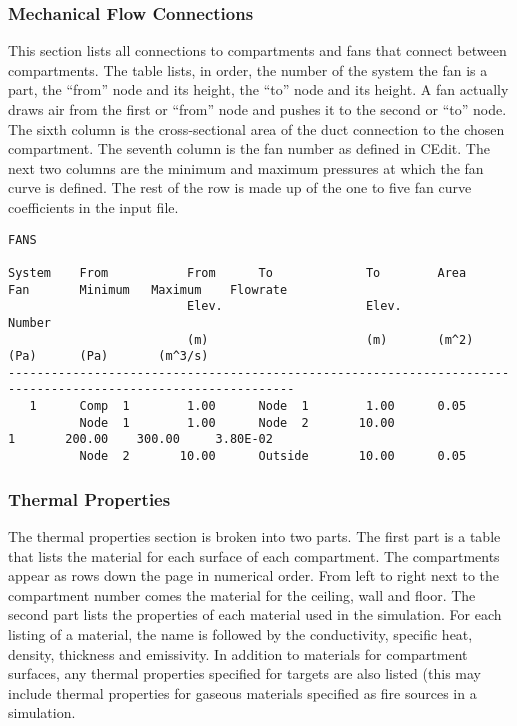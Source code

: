 \subsubsection{Mechanical Flow Connections}

This section lists all connections to compartments and fans that connect between compartments. The table lists, in order, the number of the system the fan is a part, the ``from'' node and its height, the ``to'' node and its height.  A fan actually draws air from the first or ``from'' node and pushes it to the second or ``to'' node. The sixth column is the cross-sectional area of the duct connection to the chosen compartment. The seventh column is the fan number as defined in CEdit.  The next two columns are the minimum and maximum pressures at which the fan curve is defined.  The rest of the row is made up of the one to five fan curve coefficients in the input file.

\begin{lstlisting}[basicstyle=\tiny]
FANS

System    From           From      To             To        Area      Fan       Minimum   Maximum    Flowrate
                         Elev.                    Elev.               Number
                         (m)                      (m)       (m^2)               (Pa)      (Pa)       (m^3/s)
--------------------------------------------------------------------------------------------------------------
   1      Comp  1        1.00      Node  1        1.00      0.05
          Node  1        1.00      Node  2       10.00                  1       200.00    300.00     3.80E-02
          Node  2       10.00      Outside       10.00      0.05
\end{lstlisting}

\subsubsection{Thermal Properties}

The thermal properties section is broken into two parts.  The first part is a table that lists the material for each surface of each compartment.  The compartments appear as rows down the page in numerical order.  From left to right next to the compartment number comes the material for the ceiling, wall and floor.  The second part lists the properties of each material used in the simulation. For each listing of a material, the name is followed by the conductivity, specific heat, density, thickness and emissivity. In addition to materials for compartment surfaces, any thermal properties specified for targets are also listed (this may include thermal properties for gaseous materials specified as fire sources in a simulation.

